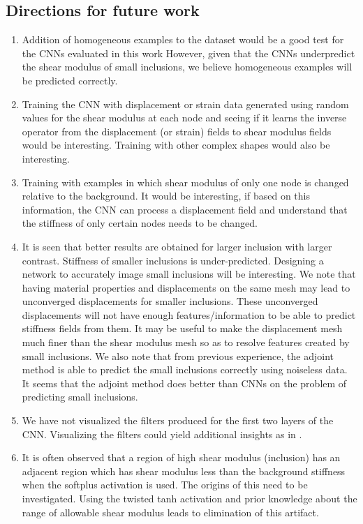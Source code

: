 \documentclass[12pt]{article}
\begin{document}
\subsection{Directions for future work}
\begin{enumerate}
\item{Addition of homogeneous examples to the dataset would be a good test for the CNNs evaluated in this work However, given that the CNNs underpredict the shear modulus of small inclusions, we believe homogeneous examples will be predicted correctly.}
\item{Training the CNN with displacement or strain data generated using random values for the shear modulus at each node and seeing if it learns the inverse operator from the displacement (or strain) fields to shear modulus fields would be interesting. Training with other complex shapes would also be interesting.}
\item{Training with examples in which shear modulus of only one node is changed relative to the background. It would be interesting, if based on this information, the CNN can process a displacement field and understand that the stiffness of only certain nodes needs to be changed.}
\item{It is seen that better results are obtained for larger inclusion with larger contrast. Stiffness of smaller inclusions is under-predicted. Designing a network to accurately image small inclusions will be interesting. We note that having material properties and displacements on the same mesh may lead to unconverged displacements for smaller inclusions. These unconverged displacements will not have enough features/information to be able to predict stiffness fields from them. It may be useful to make the displacement mesh much finer than the shear modulus mesh so as to resolve features created by small inclusions. We also note that from previous experience, the adjoint method \cite{paper:oberai2003} is able to predict the small inclusions correctly using noiseless data. It seems that the adjoint method does better than CNNs on the problem of predicting small inclusions.}
\item{We have not visualized the filters produced for the first two layers of the CNN. Visualizing the filters could yield additional insights as in \cite{paper:pateloberai2019,misc:vizfilterlink}.}
\item{It is often observed that a region of high shear modulus (inclusion) has an adjacent region which has shear modulus less than the background stiffness when the softplus activation is used. The origins of this need to be investigated. Using the twisted tanh activation and prior knowledge about the range of allowable shear modulus leads to elimination of this artifact.}

\end{enumerate}
\end{document}
